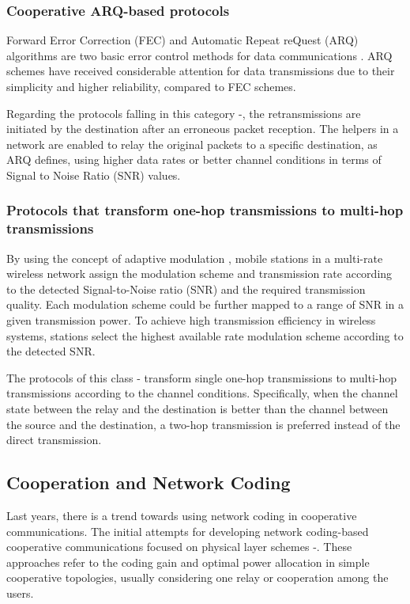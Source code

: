 \documentclass[conference]{IEEEtran}
\begin{document}
\subsubsection{Cooperative ARQ-based protocols}
Forward Error Correction (FEC) and Automatic Repeat reQuest (ARQ) algorithms are two basic error control methods for data communications \cite{IEEEhowto:arq}. ARQ schemes have received considerable attention for data transmissions due to their simplicity and higher reliability, compared to FEC schemes.

Regarding the protocols falling in this category \cite{IEEEhowto:maccoop1}-\cite{IEEEhowto:maccoop3}, the retransmissions are initiated by the destination after an erroneous packet reception. The helpers in a network are enabled to relay the original packets to a specific destination, as ARQ defines, using higher data rates or better channel conditions in terms of Signal to Noise Ratio (SNR) values.

\subsubsection{Protocols that transform one-hop transmissions to multi-hop transmissions}

By using the concept of adaptive modulation \cite{IEEEhowto:am}, mobile stations in a multi-rate wireless network assign the modulation scheme and transmission rate according to the detected Signal-to-Noise ratio (SNR) and the required transmission quality. Each modulation scheme could be further mapped to a range of SNR in a given transmission power. To achieve high transmission efficiency in wireless systems, stations select the highest available rate modulation scheme according to the detected SNR.

The protocols of this class \cite{IEEEhowto:macmr1}-\cite{IEEEhowto:macmr4} transform single one-hop transmissions to multi-hop transmissions according to the channel conditions. Specifically, when the channel state between the relay and the destination is better than the channel between the source and the destination, a two-hop transmission is preferred instead of the direct transmission.

\subsection{Cooperation and Network Coding}

Last years, there is a trend towards using network coding in cooperative communications. The initial attempts for developing network coding-based cooperative communications focused on physical layer schemes \cite{IEEEhowto:phycoopnc1}-\cite{IEEEhowto:phycoopnc3}. These approaches refer to the coding gain and optimal power allocation in simple cooperative topologies, usually considering one relay or cooperation among the users.
\end{document}

